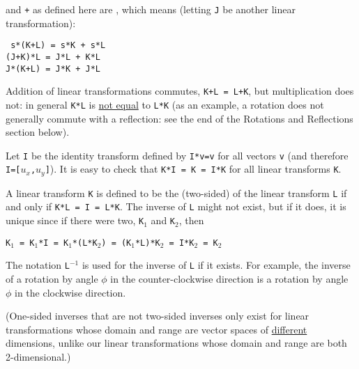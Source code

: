 \documentclass[12pt]{article}
\begin{document}
{\tt *} and {\tt +} as defined here are , which means
(letting {\tt J} be another linear transformation):
\begin{center}
\tt
s*(K+L) = s*K + s*L \\
(J+K)*L = J*L + K*L \\
J*(K+L) = J*K + J*L
\end{center}

Addition of linear transformations commutes,
{\tt K+L = L+K}, but multiplication does not:
in general {\tt K*L} is \underline{not equal} to {\tt L*K}
(as an example, a rotation does not generally commute with
a reflection: see the end of the Rotations and Reflections
section below).

Let {\tt I} be the identity transform defined by
{\tt I*v=v} for all vectors {\tt v}  (and therefore {\tt I=[$u_x$,$u_y$]}).
It is easy to check that {\tt K*I = K = I*K} for all linear transforms
{\tt K}.

A linear transform {\tt K} is defined to be the (two-sided) 
of the linear transform {\tt L} if and only if {\tt K*L = I = L*K}.
The inverse of {\tt L} might not exist, but if it does, it is unique
since if there were two, {\tt K$_1$} and {\tt K$_2$}, then \\
\centerline{\tt K$_1$ = K$_1$*I = K$_1$*(L*K$_2$)
                      = (K$_1$*L)*K$_2$ = I*K$_2$ = K$_2$}
The notation {\tt L$^{-1}$} is used for the inverse of {\tt L} if it
exists.  For example, the inverse of a rotation by angle $\phi$ in the
counter-clockwise direction is a rotation by angle $\phi$ in the
clockwise direction.

(One-sided inverses that are not two-sided inverses only exist for
linear transformations whose domain and range are vector spaces of
\underline{different} dimensions, unlike our linear transformations
whose domain and range are both 2-dimensional.)



\newpage
\end{document}
